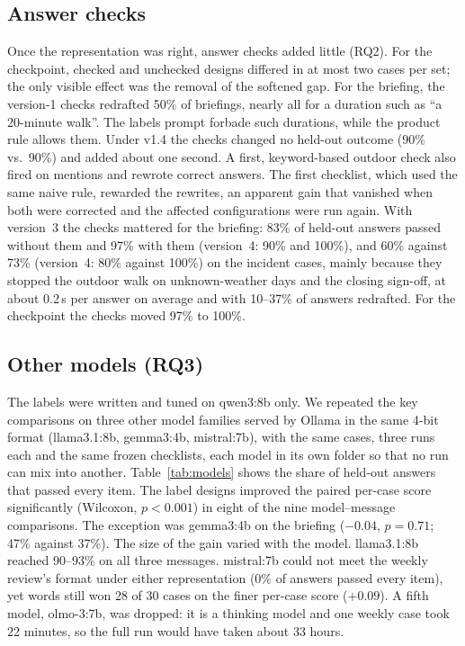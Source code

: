 \documentclass[10pt,twocolumn]{article}
\begin{document}
\subsection{Answer checks}
\label{sec:res-checks}

Once the representation was right, answer checks added little (RQ2). For the checkpoint, checked and unchecked
designs differed in at most two cases per set; the only visible effect was the removal of the softened gap. For the
briefing, the version-1 checks redrafted 50\% of briefings, nearly all for a duration such as ``a 20-minute walk''.
The labels prompt forbade such durations, while the product rule allows them. Under v1.4 the checks changed no held-out outcome
(90\% vs.\ 90\%) and added about one second. A first, keyword-based outdoor check also fired on mentions and rewrote
correct answers. The first checklist, which used the same naive rule, rewarded the rewrites, an apparent gain that
vanished when both were corrected and the affected configurations were run again. With version~3 the checks
mattered for the briefing: 83\% of held-out answers passed without them and 97\% with them (version~4: 90\% and 100\%),
and 60\% against 73\% (version~4: 80\% against 100\%) on the incident cases, mainly because they stopped the outdoor walk
on unknown-weather days and the closing sign-off, at about 0.2\,s per answer on average and with 10--37\% of answers
redrafted. For the checkpoint the checks moved
97\% to 100\%.

\subsection{Other models (RQ3)}
\label{sec:res-models}

The labels were written and tuned on qwen3:8b only. We repeated the key comparisons on three other model families served
by Ollama in the same 4-bit format (llama3.1:8b, gemma3:4b, mistral:7b), with the same cases, three runs each and the same
frozen checklists, each model in its own folder so that no run can mix into another. Table~\ref{tab:models} shows the share
of held-out answers that passed every item. The label designs improved the paired per-case score significantly (Wilcoxon,
$p<0.001$) in eight of the nine model--message comparisons. The exception was gemma3:4b on the briefing ($-0.04$,
$p=0.71$; 47\% against 37\%). The size of the gain varied with the model. llama3.1:8b reached 90--93\% on all three
messages. mistral:7b could not meet the weekly review's format under either representation (0\% of answers passed every
item), yet words still won 28 of 30 cases on the finer per-case score ($+0.09$). A fifth model, olmo-3:7b, was dropped:
it is a thinking model and one weekly case took 22 minutes, so the full run would have taken about 33 hours.
\end{document}

